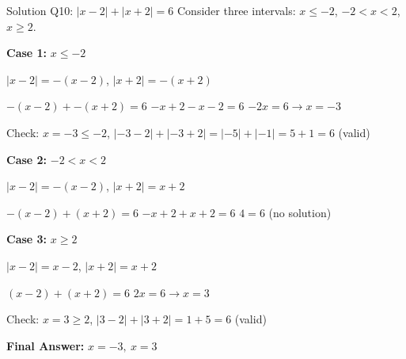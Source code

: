 \documentclass[aspectratio=169]{beamer}
\begin{document}
\begin{frame}{Solution Q10: $|x-2| + |x+2| = 6$}
    \footnotesize
    Consider three intervals: $x\leq-2$, $-2<x<2$, $x\geq2$.
    
    \textbf{Case 1:} $x\leq-2$
    
    $|x-2|=-(x-2)$, $|x+2|=-(x+2)$
    
    $-(x-2) + -(x+2) = 6$
    $-x+2-x-2=6$
    $-2x=6 \rightarrow x=-3$
    
    Check: $x=-3\leq-2$, $|-3-2|+|-3+2|=| -5 | + | -1 | = 5+1=6$ (valid)
    
    \textbf{Case 2:} $-2<x<2$
    
    $|x-2|=-(x-2)$, $|x+2|=x+2$
    
    $-(x-2)+(x+2)=6$
    $-x+2+x+2=6$
    $4=6$ (no solution)
    
    \textbf{Case 3:} $x\geq2$
    
    $|x-2|=x-2$, $|x+2|=x+2$
    
    $(x-2)+(x+2)=6$
    $2x=6 \rightarrow x=3$
    
    Check: $x=3\geq2$, $|3-2|+|3+2|=1+5=6$ (valid)
    
    \textbf{Final Answer:} $x=-3,\ x=3$
\end{frame}
\end{document}
